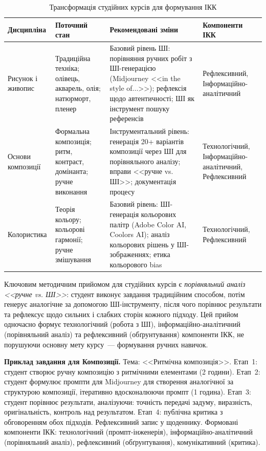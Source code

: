 \begin{table}[htbp]
\centering
\caption{Трансформація студійних курсів для формування ІКК}\label{tab:studio-transform}
\small
\begin{tabularx}{\textwidth}{@{}p{}p{}p{}p{}@{}}
\toprule
\textbf{Дисципліна} & \textbf{Поточний стан} & \textbf{Рекомендовані зміни} & \textbf{Компоненти ІКК} \\
\midrule
Рисунок і живопис & Традиційна техніка; олівець, акварель, олія; натюрморт, пленер & Базовий рівень ШІ: порівняння ручних робіт з ШІ-генерацією (Midjourney <<in the style of...>>); рефлексія щодо автентичності; ШІ як інструмент пошуку референсів & Рефлексивний, Інформаційно-аналітичний \\
\addlinespace
Основи композиції & Формальна композиція; ритм, контраст, домінанта; ручне виконання & Інструментальний рівень: генерація 20+ варіантів композиції через ШІ для порівняльного аналізу; вправи <<ручне vs. ШІ>>; документація процесу & Технологічний, Інформаційно-аналітичний, Рефлексивний \\
\addlinespace
Колористика & Теорія кольору; кольорові гармонії; ручне змішування & Базовий рівень: ШІ-генерація кольорових палітр (Adobe Color AI, Coolors AI); аналіз кольорових рішень у ШІ-зображеннях; етика кольорового bias & Технологічний, Рефлексивний \\
\bottomrule
\end{tabularx}
\end{table}

Ключовим методичним прийомом для студійних курсів є \textit{порівняльний аналіз <<ручне vs. ШІ>>}: студент виконує завдання традиційним способом, потім генерує аналогічне за допомогою ШІ-інструменту, після чого порівнює результати та рефлексує щодо сильних і слабких сторін кожного підходу. Цей прийом одночасно формує технологічний (робота з ШІ), інформаційно-аналітичний (порівняльний аналіз) та рефлексивний (обґрунтування) компоненти ІКК, не порушуючи основну мету курсу~--- формування ручних навичок.

\textbf{Приклад завдання для Композиції.} Тема: <<Ритмічна композиція>>. Етап~1: студент створює ручну композицію з ритмічними елементами (2 години). Етап~2: студент формулює промпти для Midjourney для створення аналогічної за структурою композиції, ітеративно вдосконалюючи промпт (1 година). Етап~3: студент порівнює результати, аналізуючи: точність передачі задуму, виразність, оригінальність, контроль над результатом. Етап~4: публічна критика з обговоренням обох підходів. Рефлексивний запис у щоденнику. Формовані компоненти ІКК: технологічний (промпт-інженерія), інформаційно-аналітичний (порівняльний аналіз), рефлексивний (обґрунтування), комунікативний (критика).

